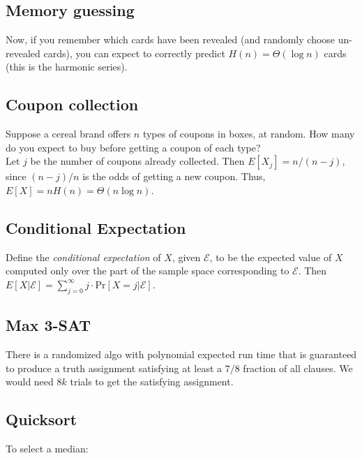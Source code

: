 \subsection{Memory guessing}
Now, if you remember which cards have been revealed (and randomly choose un-revealed cards), you can expect to correctly predict $H(n) = \Theta(\log n)$ cards (this is the harmonic series).

\subsection{Coupon collection}
Suppose a cereal brand offers $n$ types of coupons in boxes, at random. How many do you expect to buy before getting a coupon of each type?\\

Let $j$ be the number of coupons already collected. Then $E[ X_{j}] = n / (n - j)$, since $( n - j ) / n$ is the odds of getting a new coupon. Thus, $E[X] = nH(n) = \Theta(n \log n)$.

\subsection{Conditional Expectation}
Define the \emph{conditional expectation} of $X$, given $\mathscr{E}$, to be the expected value of $X$ computed only over the part of the sample space corresponding to $\mathscr{E}$. Then $E[ X | \mathscr{E} ] =  \sum_{j=0}^{\infty} j \cdot \text{Pr} [ X = j | \mathscr{E} ]$.

\subsection{Max 3-SAT}
There is a randomized algo with polynomial expected run time that is guaranteed to produce a truth assignment satisfying at least a $7/8$ fraction of all clauses. We would need $8k$ trials to get the satisfying assignment.

\subsection{Quicksort}

To select a median:
\begin{algorithmic}[1]
		\EndFor
		\Else
		\EndIf
	\EndFunction
\end{algorithmic}


